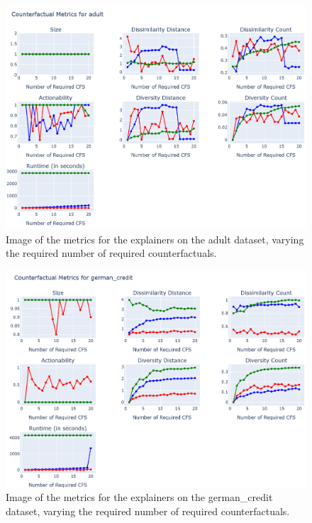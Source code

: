\begin{figure}[!htbp]
    \centering
    \includegraphics[width=\textwidth]{images/metrics-adult.png}
    \caption{Image of the metrics for the explainers on the adult dataset, varying the required number of
required counterfactuals.}
    \label{fig:metrics-adult}
\end{figure}
\begin{figure}[!htbp]
    \centering
    \includegraphics[width=\textwidth]{images/metrics-german_credit.png}
    \caption{Image of the metrics for the explainers on the german\_credit dataset, varying the required number of
required counterfactuals.}
    \label{fig:metrics-german_credit}
\end{figure}
